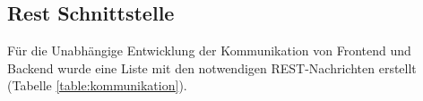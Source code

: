 \subsection{Rest Schnittstelle}
Für die Unabhängige Entwicklung der Kommunikation von Frontend und Backend wurde eine Liste mit den notwendigen REST-Nachrichten erstellt (Tabelle \ref{table:kommunikation}).\\\\
\begin{table}[]
	\centering
	\caption{Kommunikation Backend und Frontend}
	\label{table:kommunikation}
\end{table}
